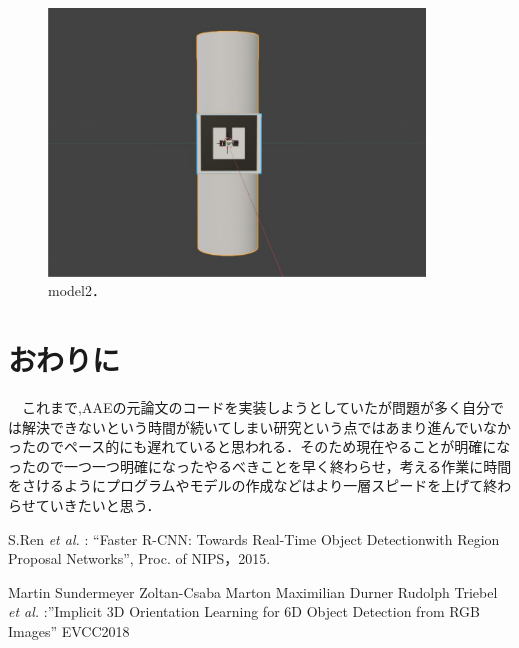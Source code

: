 \documentclass[11pt,a4j,ascmac]{jsarticle}
\begin{document}
      \begin{figure}[htpp]
      \centering
      \includegraphics[width=100mm]{11-4.eps}
      \vspace*{25mm}
      \caption{model2．}
      \label{style4}
      \end{figure}






\section{おわりに}
　これまで,AAEの元論文のコードを実装しようとしていたが問題が多く自分では解決できないという時間が続いてしまい研究という点ではあまり進んでいなかったのでペース的にも遅れていると思われる．そのため現在やることが明確になったので一つ一つ明確になったやるべきことを早く終わらせ，考える作業に時間をさけるようにプログラムやモデルの作成などはより一層スピードを上げて終わらせていきたいと思う．


\footnotesize
\begin{thebibliography}{99}

S.Ren {\em et al. }: ``Faster R-CNN: Towards Real-Time Object Detectionwith Region Proposal Networks'', Proc. of NIPS，2015.


Martin Sundermeyer Zoltan-Csaba Marton Maximilian Durner Rudolph Triebel {\em et al. }:''Implicit 3D Orientation Learning for 6D Object Detection from RGB Images''  EVCC2018　




\end{thebibliography}

\normalsize
\end{document}
